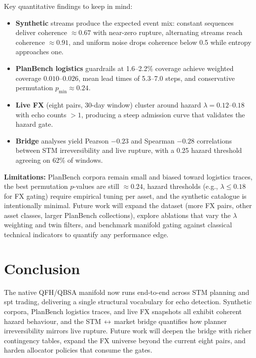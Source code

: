 \documentclass[11pt]{article}
\begin{document}
Key quantitative findings to keep in mind:
\begin{itemize}
  \item \textbf{Synthetic} streams produce the expected event mix: constant sequences deliver coherence $\approx0.67$ with near-zero rupture, alternating streams reach coherence $\approx0.91$, and uniform noise drops coherence below 0.5 while entropy approaches one.
  \item \textbf{PlanBench logistics} guardrails at 1.6--2.2\% coverage achieve weighted coverage $0.010$--$0.026$, mean lead times of 5.3--7.0 steps, and conservative permutation $p_{\min}\approx0.24$.
  \item \textbf{Live FX} (eight pairs, 30-day window) cluster around hazard $\lambda=0.12$--$0.18$ with echo counts $>1$, producing a steep admission curve that validates the hazard gate.
  \item \textbf{Bridge} analyses yield Pearson \(-0.23\) and Spearman \(-0.28\) correlations between STM irreversibility and live rupture, with a 0.25 hazard threshold agreeing on 62\% of windows.
\end{itemize}

\textbf{Limitations:} PlanBench corpora remain small and biased toward logistics traces, the best permutation $p$-values are still \(\approx0.24\), hazard thresholds (e.g., $\lambda \leq 0.18$ for FX gating) require empirical tuning per asset, and the synthetic catalogue is intentionally minimal. Future work will expand the dataset (more FX pairs, other asset classes, larger PlanBench collections), explore ablations that vary the $\lambda$ weighting and twin filters, and benchmark manifold gating against classical technical indicators to quantify any performance edge.

\section{Conclusion}
The native QFH/QBSA manifold now runs end-to-end across STM planning and spt trading, delivering a single structural vocabulary for echo detection. Synthetic corpora, PlanBench logistics traces, and live FX snapshots all exhibit coherent hazard behaviour, and the STM\,$\leftrightarrow$\,market bridge quantifies how planner irreversibility mirrors live rupture. Future work will deepen the bridge with richer contingency tables, expand the FX universe beyond the current eight pairs, and harden allocator policies that consume the gates.

\appendix
\end{document}
